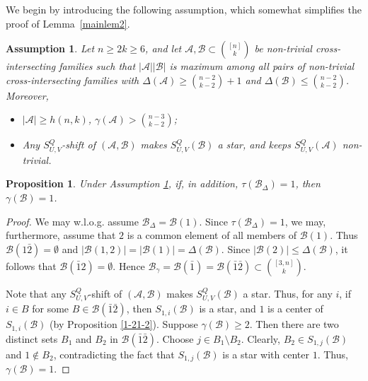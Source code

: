 \documentclass[a4paper,11pt]{article}
\newtheorem{proposition}[theorem]{Proposition}
\newtheorem{assumption}[theorem]{Assumption}
\newcommand{\m}{\mathcal}
\begin{document}
We begin by introducing the following assumption, which somewhat simplifies the proof of Lemma~\ref{mainlem2}.
\begin{assumption}\label{asm}
Let $n\ge 2k\ge 6$, and let $\mathcal{A}, \mathcal{B} \subset {[n]\choose k}$ be non-trivial cross-intersecting families such that $|\m A||\m B|$ is maximum among all pairs of non-trivial cross-intersecting families with  
$\Delta(\m A)\ge {n-2\choose k-2}+1$ and 
$\Delta(\m B)\le {n-2\choose k-2}$. Moreover, 
\begin{itemize}
\item $|\m A|\ge h(n,k)$, $\gamma(\m A)>{n-3\choose k-2}$;
\item Any $S^{Q}_{U,V}$-shift of $(\m A, \m B)$ makes $S_{U,V}^Q(\m B)$ a star, and keeps $S_{U,V}^Q(\m A)$ non-trivial.
\end{itemize}
\end{assumption}

\begin{proposition}\label{covernumber1}
Under Assumption \ref{asm}, if, in addition, $\tau(\m B_{\Delta})=1$, then $\gamma(\m B)=1$.
\end{proposition}

\begin{proof}
We may w.l.o.g. assume $\mathcal B_\Delta=\mathcal B(1).$
Since $\tau(\mathcal B_\Delta)=1$, we may, furthermore, assume that $2$ is a common
element of all members of $\mathcal B(1)$. Thus
$\mathcal B(1\bar2)=\emptyset$ and
$|\mathcal B(1,2)|=|\mathcal B(1)|=\Delta(\mathcal B)$.
Since $|\mathcal B(2)|\le \Delta(\mathcal B)$, it follows that
$\mathcal B(\bar1 2)=\emptyset$. Hence
$\mathcal B_\gamma=\mathcal B(\bar1)=\mathcal B(\bar1\bar2)
\subset {[3,n]\choose k}.$

Note that any $S^{Q}_{U,V}$-shift of $(\m A, \m B)$ makes $S_{U,V}^Q(\m B)$ a star. 
Thus, for any $i$, if $i\in B$ for some $B\in \m B(\bar1\bar2)$, then $S_{1,i}(\m B)$ is a star, and $1$ is a center of  $S_{1,i}(\m B)$ (by  Proposition \ref{1-21-2}). 
Suppose $\gamma(\m B)\ge 2$. Then there are two distinct sets $B_1$ and $B_2$ in $\m B(\bar 1 \bar 2)$.
Choose $j\in B_1\setminus B_2$. 
Clearly, $B_2\in S_{1,j}(\m B)$ and $1\not\in B_2$,  
contradicting the fact that $S_{1,j}(\mathcal B)$ is a star with center $1$. Thus, $\gamma(\m B)=1$. 
\end{proof}
\end{document}
